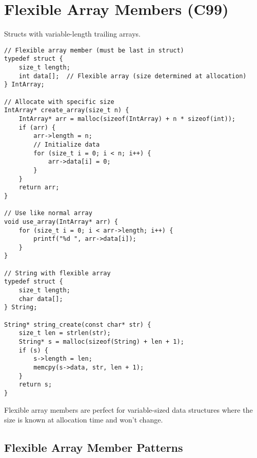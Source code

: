 \section{Flexible Array Members (C99)}

Structs with variable-length trailing arrays.

\begin{lstlisting}
// Flexible array member (must be last in struct)
typedef struct {
    size_t length;
    int data[];  // Flexible array (size determined at allocation)
} IntArray;

// Allocate with specific size
IntArray* create_array(size_t n) {
    IntArray* arr = malloc(sizeof(IntArray) + n * sizeof(int));
    if (arr) {
        arr->length = n;
        // Initialize data
        for (size_t i = 0; i < n; i++) {
            arr->data[i] = 0;
        }
    }
    return arr;
}

// Use like normal array
void use_array(IntArray* arr) {
    for (size_t i = 0; i < arr->length; i++) {
        printf("%d ", arr->data[i]);
    }
}

// String with flexible array
typedef struct {
    size_t length;
    char data[];
} String;

String* string_create(const char* str) {
    size_t len = strlen(str);
    String* s = malloc(sizeof(String) + len + 1);
    if (s) {
        s->length = len;
        memcpy(s->data, str, len + 1);
    }
    return s;
}
\end{lstlisting}

\begin{tipbox}
Flexible array members are perfect for variable-sized data structures where the size is known at allocation time and won't change.
\end{tipbox}

\subsection{Flexible Array Member Patterns}

